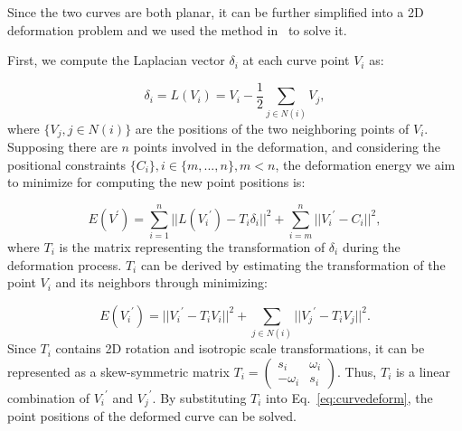 Since the two curves are both planar, it can be further simplified 
into a 2D deformation problem and we used the method in~\cite{ESA07}
to solve it.

First, we compute the Laplacian vector $\delta_i$ at each curve point $V_i$
as:

\begin{equation}
\label{eq:curveLap}
 \delta_i=L(V_i)=V_i- \frac{1}{2} \sum\limits_{j \in N(i)} {V_j},
\end{equation}
where $\{V_j, j\in N(i)\}$ are the positions of the two neighboring
points of $V_i$. Supposing there are $n$ points involved in the
deformation,  and considering the positional constraints
$\{C_i\},i\in\{m,...,n\},m<n$, the deformation energy we aim to
minimize for computing the new point positions is:

\begin{equation}
\label{eq:curvedeform}
    E(V^\prime)=\sum\limits_{i=1}^n{||L({V_i}^\prime)-T_i\delta_i||^2}
    +\sum\limits_{i=m}^n{||{V_i}^\prime-C_i||^2},
\end{equation}
where $T_i$ is the matrix representing the transformation of $\delta_i$ 
during the deformation process. $T_i$ can be derived by estimating the 
transformation of the point $V_i$ and its neighbors through minimizing:

\begin{equation}
\label{eq:curveLapTi}
    E({V_i}^\prime)=||{V_i}^\prime-T_iV_i||^2 + 
    \sum\limits_{j \in N(i)}{||{V_j}^\prime-T_iV_j||^2}.
\end{equation}
Since $T_i$ contains 2D rotation and isotropic scale transformations,
it can be represented as a skew-symmetric matrix
$T_i= \begin{pmatrix} s_i & \omega_i \\ -\omega_i & s_i \end{pmatrix}$.
Thus, $T_i$ is a linear combination of ${V_i}^\prime$
and ${V_j}^\prime$. By substituting $T_i$ into Eq.~\ref{eq:curvedeform},
the point positions of the deformed curve can be solved.




